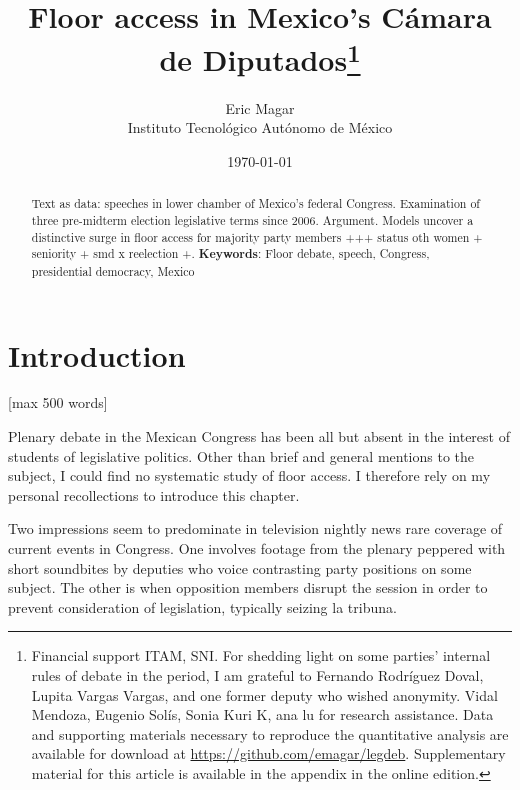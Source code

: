 \documentclass[letter,12pt]{article}
\begin{document}
\title{Floor access in Mexico's Cámara de Diputados\thanks{Financial support ITAM, SNI. For shedding light on some parties' internal rules of debate in the period, I am grateful to Fernando Rodríguez Doval, Lupita Vargas Vargas, and one former deputy who wished anonymity. Vidal Mendoza, Eugenio Solís, Sonia Kuri K, ana lu for research assistance. Data and supporting materials necessary to reproduce the quantitative analysis are available for download at \url{https://github.com/emagar/legdeb}. Supplementary material for this article is available in the appendix in the online edition.}}
\author{Eric Magar \\ Instituto Tecnológico Autónomo de México}
\date{\today}
\maketitle


\begin{abstract}
\noindent Text as data: speeches in lower chamber of Mexico's federal Congress. Examination of three pre-midterm election legislative terms since 2006. Argument. Models uncover a distinctive surge in floor access for majority party members +++
status oth
women +
seniority +
smd x reelection +.
\newline
\newline
\textbf{Keywords}: Floor debate, speech, Congress, presidential democracy, Mexico 
\end{abstract}


\doublespacing

\section{Introduction} [max 500 words]

Plenary debate in the Mexican Congress has been all but absent in the interest of students of legislative politics. Other than brief and general mentions to the subject, I could find no systematic study of floor access. I therefore rely on my personal recollections to introduce this chapter.

Two impressions seem to predominate in television nightly news rare coverage of current events in Congress. One involves footage from the plenary peppered with short soundbites by deputies who voice contrasting party positions on some subject. The other is when opposition members disrupt the session in order to prevent consideration of legislation, typically seizing la tribuna. 
\end{document}
